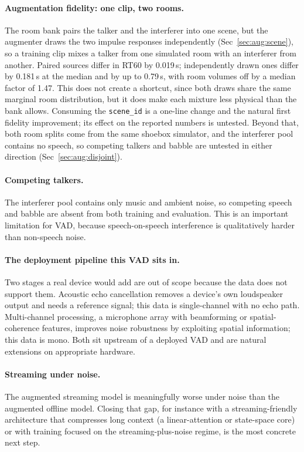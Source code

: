 \documentclass{article}
\begin{document}
\paragraph{Augmentation fidelity: one clip, two rooms.} The room bank pairs the talker and the interferer into one scene, but the augmenter draws the two impulse responses independently (Sec~\ref{sec:aug:scene}), so a training clip mixes a talker from one simulated room with an interferer from another. Paired sources differ in RT60 by 0.019\,s; independently drawn ones differ by 0.181\,s at the median and by up to 0.79\,s, with room volumes off by a median factor of 1.47. This does not create a shortcut, since both draws share the same marginal room distribution, but it does make each mixture less physical than the bank allows. Consuming the \texttt{scene\_id} is a one-line change and the natural first fidelity improvement; its effect on the reported numbers is untested. Beyond that, both room splits come from the same shoebox simulator, and the interferer pool contains no speech, so competing talkers and babble are untested in either direction (Sec~\ref{sec:aug:disjoint}).

\paragraph{Competing talkers.}
The interferer pool contains only music and ambient noise, so competing speech and babble are absent from both training and evaluation. This is an important limitation for VAD, because speech-on-speech interference is qualitatively harder than non-speech noise.

\paragraph{The deployment pipeline this VAD sits in.} Two stages a real device would add are out of scope because the data does not support them. Acoustic echo cancellation removes a device's own loudspeaker output and needs a reference signal; this data is single-channel with no echo path. Multi-channel processing, a microphone array with beamforming or spatial-coherence features, improves noise robustness by exploiting spatial information; this data is mono. Both sit upstream of a deployed VAD and are natural extensions on appropriate hardware.

\paragraph{Streaming under noise.} The augmented streaming model is meaningfully worse under noise than the augmented offline model. Closing that gap, for instance with a streaming-friendly architecture that compresses long context (a linear-attention or state-space core) or with training focused on the streaming-plus-noise regime, is the most concrete next step.
\end{document}
